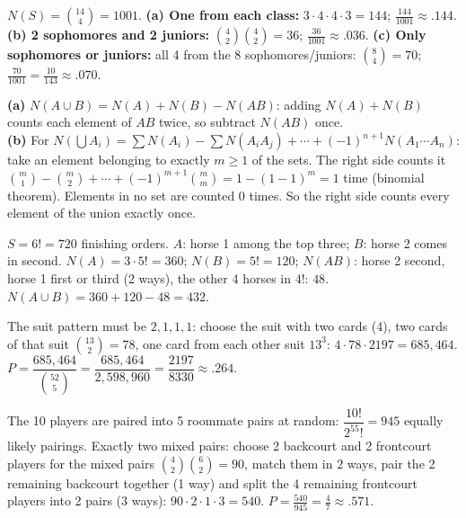 \documentclass[11pt]{article}
\begin{document}
\begin{exbox}
$N(S)=\binom{14}4=1001$. \textbf{(a) One from each class:} $3\cdot4\cdot4\cdot3=144$; $\tfrac{144}{1001}\approx\boxed{.144}$. \textbf{(b) 2 sophomores and 2 juniors:} $\binom42\binom42=36$; $\tfrac{36}{1001}\approx\boxed{.036}$. \textbf{(c) Only sophomores or juniors:} all 4 from the 8 sophomores/juniors: $\binom84=70$; $\tfrac{70}{1001}=\tfrac{10}{143}\approx\boxed{.070}$.
\end{exbox}

\begin{exbox}
\textbf{(a)} $N(A\cup B)=N(A)+N(B)-N(AB)$: adding $N(A)+N(B)$ counts each element of $AB$ twice, so subtract $N(AB)$ once.\\
\textbf{(b)} For $N(\bigcup A_i)=\sum N(A_i)-\sum N(A_iA_j)+\cdots+(-1)^{n+1}N(A_1\cdots A_n)$: take an element belonging to exactly $m\ge1$ of the sets. The right side counts it $\binom m1-\binom m2+\cdots+(-1)^{m+1}\binom mm=1-(1-1)^m=1$ time (binomial theorem). Elements in no set are counted 0 times. So the right side counts every element of the union exactly once.
\end{exbox}

\begin{exbox}
$S=6!=720$ finishing orders. $A$: horse 1 among the top three; $B$: horse 2 comes in second. $N(A)=3\cdot5!=360$; $N(B)=5!=120$; $N(AB)$: horse 2 second, horse 1 first or third (2 ways), the other 4 horses in $4!$: $48$. $N(A\cup B)=360+120-48=\boxed{432}$.
\end{exbox}

\begin{exbox}
The suit pattern must be $2,1,1,1$: choose the suit with two cards (4), two cards of that suit $\binom{13}2=78$, one card from each other suit $13^3$: $4\cdot78\cdot2197=685{,}464$. $P=\dfrac{685{,}464}{\binom{52}5}=\dfrac{685{,}464}{2{,}598{,}960}=\dfrac{2197}{8330}\approx\boxed{.264}$.
\end{exbox}

\begin{exbox}
The 10 players are paired into 5 roommate pairs at random: $\dfrac{10!}{2^55!}=945$ equally likely pairings. Exactly two mixed pairs: choose 2 backcourt and 2 frontcourt players for the mixed pairs $\binom42\binom62=90$, match them in $2$ ways, pair the 2 remaining backcourt together (1 way) and split the 4 remaining frontcourt players into 2 pairs (3 ways): $90\cdot2\cdot1\cdot3=540$. $P=\tfrac{540}{945}=\boxed{\tfrac47}\approx.571$.
\end{exbox}
\end{document}
